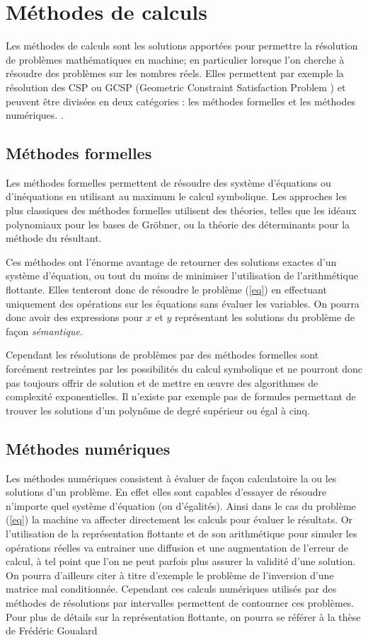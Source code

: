 \section{Méthodes de calculs}
Les méthodes de calculs sont les solutions apportées pour permettre la résolution de problèmes mathématiques en machine; en particulier lorsque l'on cherche à résoudre des problèmes sur les nombres réels. Elles permettent par exemple la résolution des CSP  ou GCSP (Geometric Constraint Satisfaction Problem \cite{Jermann}) et peuvent être divisées en deux catégories : les méthodes formelles et les méthodes numériques. . 


\subsection{Méthodes formelles}
Les méthodes formelles permettent de résoudre des système d'équations ou d'inéquations en utilisant au maximum le calcul symbolique. Les approches les plus classiques des méthodes formelles utilisent des théories, telles que les idéaux polynomiaux pour les bases de Gröbner, ou la théorie des déterminants pour la méthode du résultant.

 Ces méthodes ont l'énorme avantage de retourner des solutions exactes d'un système d'équation, ou tout du moins de minimiser l'utilisation de l'arithmétique flottante. Elles tenteront donc de résoudre le problème (\ref{eq}) en effectuant uniquement des opérations sur les équations sans évaluer les variables. On pourra donc avoir des expressions pour $x$ et $y$ représentant les solutions du problème de façon \emph{sémantique}. 

Cependant les résolutions de problèmes par des méthodes formelles sont forcément restreintes par les possibilités du calcul symbolique et ne pourront donc pas toujours offrir de solution et de mettre en œuvre des algorithmes de complexité exponentielles. Il n'existe par exemple pas de formules permettant de trouver les solutions d'un polynôme de degré supérieur ou égal à cinq.


\subsection{Méthodes numériques}
Les méthodes numériques consistent à évaluer de façon calculatoire la ou les solutions d'un problème. En effet elles sont capables d'essayer de résoudre n'importe quel système d'équation (ou d'égalités). Ainsi dans le cas du problème (\ref{eq}) la machine va affecter directement les calculs pour évaluer le résultats. Or l'utilisation de la représentation flottante et de son arithmétique pour simuler les opérations réelles va entrainer une diffusion et une augmentation de l'erreur de calcul, à tel point que l'on ne peut  parfois plus assurer la validité d'une solution. On pourra d'ailleurs citer à titre d'exemple le problème de l'inversion d'une matrice mal conditionnée. Cependant ces calculs numériques utilisés  par des méthodes de résolutions par intervalles permettent de contourner ces problèmes. Pour plus de détails sur la représentation flottante, on pourra se référer à la thèse de Frédéric Goualard \cite{Goualard}

